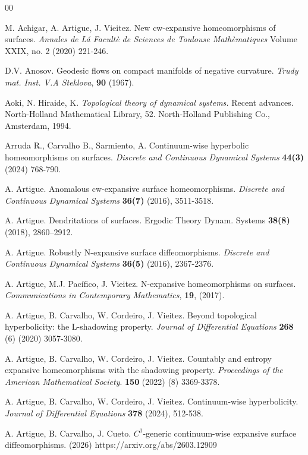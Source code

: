 \documentclass{amsart}
\theoremstyle{plain}
\theoremstyle{definition}
\begin{document}
\begin{thebibliography}{00}

 M. Achigar, A. Artigue, J. Vieitez. New cw-expansive homeomorphisms of surfaces. \emph{Annales de L\'a Facult\`e de Sciences de Toulouse Math\`ematiques} Volume XXIX, no. 2 (2020) 221-246.

 D.V. Anosov. Geodesic flows on compact manifolds of negative curvature. \emph{Trudy mat. Inst. V.A Steklova}, \textbf{90} (1967).

 Aoki, N. Hiraide, K. \emph{Topological theory of dynamical systems.} Recent advances. North-Holland Mathematical Library, 52. North-Holland Publishing Co., Amsterdam, 1994.

 Arruda R., Carvalho B., Sarmiento, A. Continuum-wise hyperbolic homeomorphisms on surfaces. \emph{Discrete and Continuous Dynamical Systems} \textbf{44(3)} (2024) 768-790.

 A. Artigue. Anomalous cw-expansive surface homeomorphisms. \emph{Discrete and Continuous Dynamical Systems} \textbf{36(7)} (2016), 3511-3518. 

 A. Artigue. Dendritations of surfaces. Ergodic Theory Dynam. Systems \textbf{38(8)} (2018), 2860--2912.

 A. Artigue. Robustly N-expansive surface diffeomorphisms. \emph{Discrete and Continuous Dynamical Systems} \textbf{36(5)} (2016), 2367-2376.

 A. Artigue, M.J. Pac\'ifico, J. Vieitez. N-expansive homeomorphisms on surfaces.  \emph{Communications in Contemporary Mathematics}, \textbf{19}, (2017).

 A. Artigue, B. Carvalho, W. Cordeiro, J. Vieitez. Beyond topological hyperbolicity: the L-shadowing property. \emph{Journal of Differential Equations} \textbf{268} (6) (2020) 3057-3080. 

 A. Artigue, B. Carvalho, W. Cordeiro, J. Vieitez. Countably and entropy expansive homeomorphisms with the shadowing property. \emph{Proceedings of the American Mathematical Society}. \textbf{150} (2022) (8) 3369-3378.
	
 A. Artigue, B. Carvalho, W. Cordeiro, J. Vieitez. Continuum-wise hyperbolicity. \emph{Journal of Differential Equations} \textbf{378} (2024), 512-538.

 A. Artigue, B. Carvalho, J. Cueto. $C^1$-generic continuum-wise expansive surface diffeomorphisms. (2026) https://arxiv.org/abs/2603.12909


\end{thebibliography}
\end{document}
